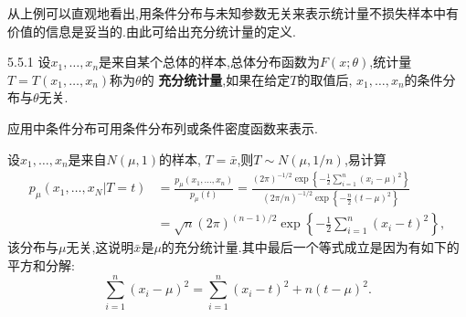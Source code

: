 从上例可以直观地看出,用条件分布与未知参数无关来表示统计量不损失样本中有价值的信息是妥当的.由此可给出充分统计量的定义.
\begin{definition}{}{5.5.1}
设$x_1,\dotsc,x_n$是来自某个总体的样本,总体分布函数为$F(x;\theta)$,统计量$T=T(x_1,\dotsc,x_n)$称为$\theta$的 \textbf{充分统计量},如果在给定$T$的取值后, $x_1,\dotsc,x_n$的条件分布与$\theta$无关.
\end{definition}

应用中条件分布可用条件分布列或条件密度函数来表示.
\begin{example}\label{exam:5.5.2}
设$x_1,\dotsc,x_n$是来自$N(\mu,1)$的样本, $T=\bar x$,则$T\sim N(\mu,1/n)$,易计算
\begin{align*}
p_\mu(x_1,\dotsc,x_N|T=t)&=\frac{p_\mu(x_1,\dotsc,x_n)}{p_\mu(t)}
=\frac{(2\pi)^{-1/2}\exp\left\{-\frac12\sum_{i=1}^n(x_i-\mu)^2\right\}}
{(2\pi/n)^{-1/2}\exp\left\{-\frac n2(t-\mu)^2\right\}}\\
&=\sqrt n(2\pi)^{(n-1)/2}\exp\left\{-\frac12\sum_{i=1}^n(x_i-t)^2\right\},
\end{align*}
该分布与$\mu$无关,这说明$\bar x$是$\mu$的充分统计量.其中最后一个等式成立是因为有如下的平方和分解:
\[\sum_{i=1}^n(x_i-\mu)^2=\sum_{i=1}^n(x_i-t)^2+n(t-\mu)^2.\]
\end{example}
